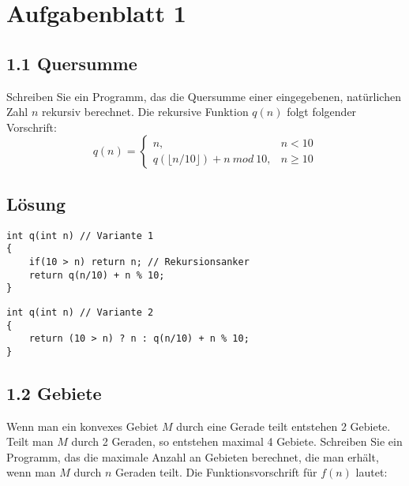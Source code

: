 \documentclass[pdflatex,a4paper,11pt]{scrartcl}
\author{J. Schönbohm}
\date{\today}
\begin{document}
\section*{Aufgabenblatt 1}
\subsection*{1.1 Quersumme} 
Schreiben Sie ein Programm, das 
die Quersumme einer eingegebenen, nat\"urlichen Zahl $n$ rekursiv berechnet. Die rekursive Funktion $q(n)$ folgt folgender Vorschrift:
$$q(n)=\left\{ 
\begin{array}{cl}
n,&n<10\\
q(\lfloor n/10\rfloor ) + n\ mod\ 10, &n\ge 10
\end{array}
\right.$$
\subsection*{L\"osung} 
\begin{lstlisting}
int q(int n) // Variante 1
{
    if(10 > n) return n; // Rekursionsanker
    return q(n/10) + n % 10;
}
\end{lstlisting}
\begin{lstlisting}
int q(int n) // Variante 2
{
    return (10 > n) ? n : q(n/10) + n % 10;
}
\end{lstlisting}

\subsection*{1.2 Gebiete} 
Wenn man ein konvexes Gebiet $M$ durch eine Gerade teilt entstehen 2 Gebiete. Teilt man $M$ durch 2 Geraden, so entstehen maximal 4 Gebiete. \newline
Schreiben Sie ein Programm, das 
die maximale Anzahl an Gebieten berechnet, die man erh\"alt, wenn man $M$ durch $n$ Geraden teilt. Die Funktionsvorschrift f\"ur $f(n)$ lautet:
\end{document}
